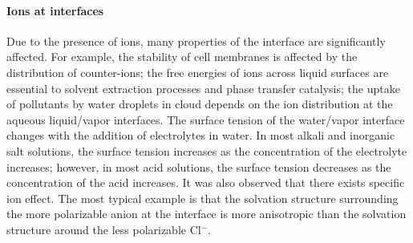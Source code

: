 \paragraph{Ions at interfaces}
Due to the presence of ions, many properties of the interface are significantly affected.
For example, the stability of cell membranes is affected by the distribution of counter-ions\cite{Veziriglu1990}; 
the free energies of ions across liquid surfaces are essential to solvent extraction processes and phase transfer catalysis\cite{Starks1994};
the uptake of pollutants by water droplets in cloud depends on the ion distribution at the aqueous liquid/vapor interfaces.
%
The surface tension of the water/vapor interface changes with the addition of electrolytes in water\cite{Pegram2006}.
In most alkali and inorganic salt solutions, the surface tension increases as the concentration of the electrolyte increases; 
however, in most acid solutions, the surface tension decreases as the concentration of the acid increases.
%
It was also observed that there exists specific ion effect. 
The most typical example is that the solvation structure surrounding the more polarizable \I anion at the interface is more anisotropic than the solvation structure around the less polarizable Cl$^-$.
%

